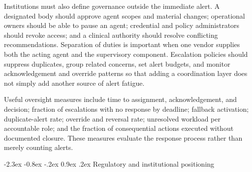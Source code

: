 \documentclass[10pt]{article}
\makeatletter
\renewcommand\section{\@startsection{section}{1}{\z@}%
  {-2.3ex \@plus -0.8ex \@minus -.2ex}%
  {0.9ex \@plus .2ex}%
  {\normalfont\sffamily\bfseries\normalsize}}
\makeatother
\begin{document}
Institutions must also define governance outside the immediate alert. A designated body should
approve agent scopes and material changes; operational owners should be able to pause an agent;
credential and policy administrators should revoke access; and a clinical authority should resolve
conflicting recommendations. Separation of duties is important when one vendor supplies both the
acting agent and the supervisory component. Escalation policies should suppress duplicates, group
related concerns, set alert budgets, and monitor acknowledgement and override patterns so that adding
a coordination layer does not simply add another source of alert fatigue.

Useful oversight measures include time to assignment, acknowledgement, and decision; fraction of
escalations with no response by deadline; fallback activation; duplicate-alert rate; override and
reversal rate; unresolved workload per accountable role; and the fraction of consequential actions
executed without documented closure. These measures evaluate the response process rather than merely
counting alerts.

\section{Regulatory and institutional positioning}
\end{document}
